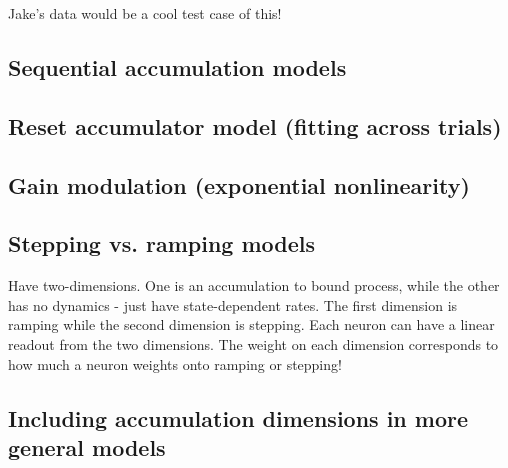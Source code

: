 \documentclass{article}
\begin{document}
Jake's data would be a cool test case of this!

\subsection{Sequential accumulation models}

\subsection{Reset accumulator model (fitting across trials)}

\subsection{Gain modulation (exponential nonlinearity)}

\subsection{Stepping vs. ramping models}
Have two-dimensions. One is an accumulation to bound process, while the other has no dynamics - just have state-dependent rates. The first dimension is ramping while the second dimension is stepping. Each neuron can have a linear readout from the two dimensions. The weight on each dimension corresponds to how much a neuron weights onto ramping or stepping! 

\subsection{Including accumulation dimensions in more general models}
\end{document}
